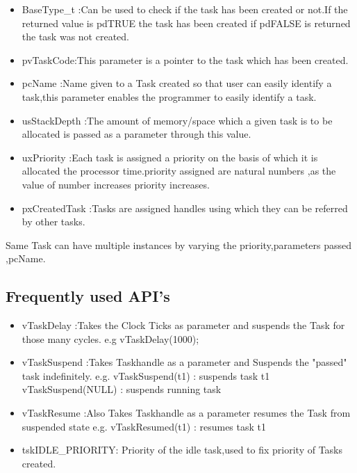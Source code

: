 \documentclass[11pt,a4paper]{book}
\begin{document}
	\begin{itemize}
		\item BaseType\_t :Can be used to check if the task has been created or not.If the returned value is pdTRUE the task has been created if pdFALSE is returned the task was not created.
		
		\item  pvTaskCode:This parameter is a pointer to the task which has been created.
		
		\item pcName :Name given to a Task created so that user can easily identify a task,this parameter enables the programmer to easily identify a task.
		
		\item usStackDepth :The amount of memory/space which a given task is to be allocated is passed as a parameter through this value.
		
		\item uxPriority :Each task is assigned a priority on the basis of which it is allocated the processor time.priority assigned are natural numbers ,as the value of number increases priority increases.
		
		\item pxCreatedTask :Tasks are assigned handles using which they can be referred by other tasks. 
	\end{itemize}
	 
	 Same Task can have multiple instances by varying the priority,parameters passed ,pcName.
	
	\subsection{Frequently used API's}
	\begin{itemize}
		\item vTaskDelay :Takes the Clock Ticks as parameter and suspends the Task for those many cycles. e.g vTaskDelay(1000);
		
		\item vTaskSuspend :Takes Taskhandle as a parameter and Suspends the "passed" task indefinitely.
		e.g. vTaskSuspend(t1) : suspends task t1 
		     vTaskSuspend(NULL) : suspends running task
		
		\item vTaskResume :Also Takes Taskhandle as a parameter resumes the Task from suspended state
		e.g. vTaskResumed(t1) : resumes task t1 
		
		\item tskIDLE\_PRIORITY: Priority of the idle task,used to fix priority of Tasks created.
	\end{itemize}
	\newpage
	
\end{document}
